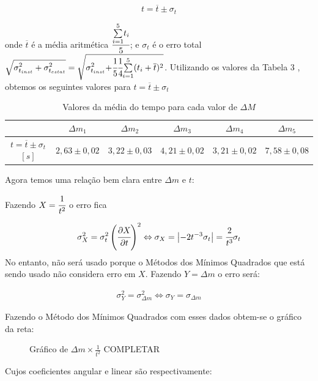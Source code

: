 \documentclass[a4paper]{article}
\providecommand{\tabularnewline}{\\} %
\begin{document}
$$t=\overline{t}\pm\sigma_{t}$$ 

onde $\overline{t}$ é a média aritmética $\cfrac[r]{\overset{{\scriptstyle 5}}{\underset{{\scriptstyle i=1}}{\sum}}t_{i}}{5}$; e $\sigma_{t}$ é o erro total $\sqrt{{\displaystyle \sigma_{t_{inst}}^{2}+\sigma_{t_{estat}}^{2}}}=\sqrt{{\displaystyle \sigma_{t_{inst}}^{2}+}\cfrac[r]{1}{5}\cfrac[l]{1}{4}\overset{{\scriptstyle 5}}{\underset{{\scriptstyle i=1}}{\sum}}(t_{i}+\overline{t})^{2}}$. Utilizando os valores da Tabela 3 , obtemos os seguintes valores para $t=\overline{t}\pm\sigma_{t}$

\begin{table}[!ht]
	\begin{centering}
	\caption{Valores da média do tempo para cada valor de $\Delta M$}
	\par\end{centering}
	\centering{}%
	\begin{tabular}{|c|c|c|c|c|c|}
	\cline{2-6} 
	\multicolumn{1}{c|}{} & $\Delta m_{1}$ & $\Delta m_{2}$ & $\Delta m_{3}$ & $\Delta m_{4}$ & $\Delta m_{5}$\tabularnewline	\hline
	$t=\overline{t}\pm\sigma_{t}$$[s]$ & $2,63\pm0,02$ & $3,22\pm0,03$ & $4,21\pm0,02$ & $3,21\pm0,02$ & $7,58\pm0,08$\tabularnewline	\hline
	\end{tabular}
\end{table}

Agora temos uma relação bem clara entre $\Delta m$ e $t$:

Fazendo $X=\cfrac{1}{t^{2}}$ o erro fica

$$\sigma_{X}^{2}=\sigma_{t}^{2}\left(\cfrac{\partial X}{\partial t}\right)^{2}\Leftrightarrow\sigma_{X}=\left|-2t^{-3}\sigma_{t}\right|=\cfrac{2}{t^{3}}\sigma_{t}$$
No entanto, não será usado porque o Métodos dos Mínimos Quadrados que está sendo usado não considera erro em $X$.
Fazendo $Y=\Delta m$ o erro será:

\begin{align}
\sigma_{Y}^{2}=\sigma_{\Delta m}^{2}\Leftrightarrow\sigma_{Y}=\sigma_{\Delta m}
\end{align}

Fazendo o Método dos Mínimos Quadrados com esses dados obtem-se o gráfico da reta:

\begin{figure}%
	\caption{Gráfico de $\Delta m\times\frac{1}{t^{2}}$ COMPLETAR}
	
\end{figure}%

Cujos coeficientes angular e linear são respectivamente:
\end{document}
